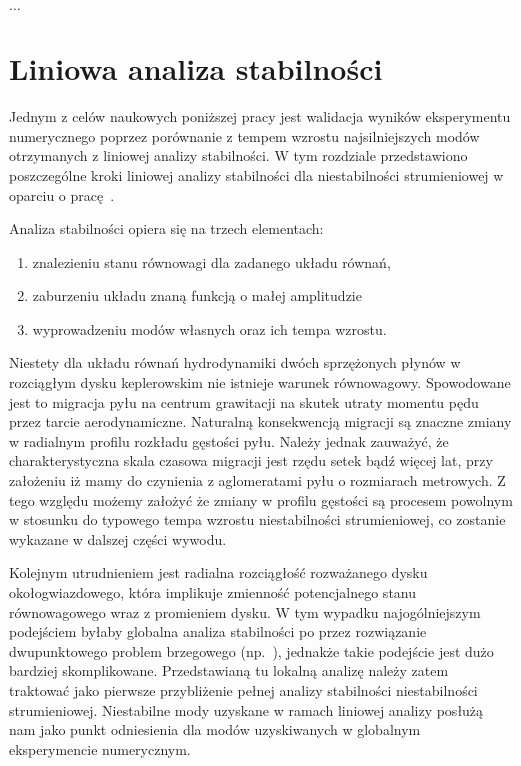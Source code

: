 \begin{savequote}[75mm]
   $\ldots$\qauthor{$\ldots$}
\end{savequote}

\chapter{Liniowa analiza stabilności}
\label{sec:lsa}
Jednym z celów naukowych poniższej pracy jest walidacja wyników eksperymentu
numerycznego poprzez porównanie z tempem wzrostu najsilniejszych modów
otrzymanych z liniowej analizy stabilności. W tym rozdziale przedstawiono
poszczególne kroki liniowej analizy stabilności dla niestabilności strumieniowej
w oparciu o pracę~\citep{YG05}.

Analiza stabilności opiera się na trzech elementach:
\begin{enumerate}
   \item znalezieniu stanu równowagi dla zadanego układu równań,
   \item zaburzeniu układu znaną funkcją o małej amplitudzie 
   \item wyprowadzeniu modów własnych oraz ich tempa wzrostu.
\end{enumerate}
Niestety dla układu równań hydrodynamiki dwóch sprzężonych płynów w rozciągłym
dysku keplerowskim nie istnieje warunek równowagowy. Spowodowane jest to
migracja pyłu na centrum grawitacji na skutek utraty momentu pędu przez tarcie
aerodynamiczne. Naturalną konsekwencją migracji są znaczne zmiany w radialnym
profilu rozkładu gęstości pyłu. Należy jednak zauważyć, że charakterystyczna
skala czasowa migracji jest rzędu setek bądź więcej lat, przy założeniu iż mamy
do czynienia z aglomeratami pyłu o rozmiarach metrowych. Z tego względu możemy
założyć że zmiany w profilu gęstości są procesem powolnym w stosunku do typowego
tempa wzrostu niestabilności strumieniowej, co zostanie wykazane w dalszej
części wywodu.

Kolejnym utrudnieniem jest radialna rozciągłość rozważanego dysku
okołogwiazdowego, która implikuje zmienność potencjalnego stanu równowagowego
wraz z promieniem dysku. W tym wypadku najogólniejszym podejściem byłaby
globalna analiza stabilności po przez rozwiązanie dwupunktowego problem
brzegowego (np.~\cite{PHM04, KH06}), jednakże takie podejście jest dużo bardziej
skomplikowane. Przedstawianą tu lokalną analizę należy zatem traktować jako
pierwsze przybliżenie pełnej analizy stabilności niestabilności strumieniowej.
Niestabilne mody uzyskane w ramach liniowej analizy posłużą nam jako punkt
odniesienia dla modów uzyskiwanych w globalnym eksperymencie numerycznym.

